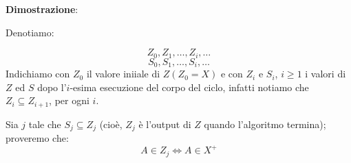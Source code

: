 \documentclass{article}
\begin{document}
\textbf{Dimostrazione}:\par
Denotiamo:\par
\begin{equation}
  Z_{0}, Z_{1}, \dots, Z_{i}, \dots 
\end{equation}
\begin{equation}
  S_{0}, S_{1}, \dots, S_{i}, \dots
\end{equation}
Indichiamo con $Z_{0}$ il valore iniiale di $Z (Z_{0} = X)$ e con $Z_{i}$ e $S_{i}$, $i \geq 1$ i valori di $Z$ ed $S$ dopo l'$i$-esima esecuzione del corpo del ciclo, infatti notiamo che $Z_{i} \subseteq Z_{i+1}$, per ogni $i$.\par
Sia $j$ tale che $S_{j} \subseteq Z_{j}$ (cioè,  $Z_{j}$ è l'output di $Z$ quando l'algoritmo termina); proveremo che:
\begin{equation}
  A \in Z_{j} \Leftrightarrow A \in X^{+} 
\end{equation}
\end{document}
